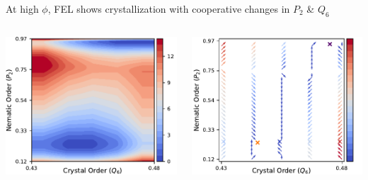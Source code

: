 \documentclass[aspectratio=169]{beamer}
\begin{document}
\begin{frame}[c]{At high $\phi$, FEL shows crystallization with cooperative changes in $P_{2}$ \& $Q_{6}$}

  \begin{columns}[T]

    \centering
    \includegraphics[width=\textwidth]{../figures/fig-pathway_10p25/subfig-pathway_10p25.pdf}

    \centering
    \includegraphics[width=\textwidth]{../figures/ch4_jcp/fig-quivers_10p25/fig-quiver_10p25.pdf}
     
  \end{columns}

\end{frame}
\end{document}
